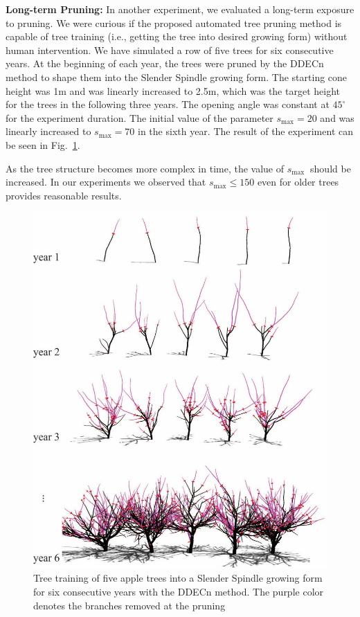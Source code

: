 \noindent\textbf{Long-term Pruning:} In another experiment, we evaluated a
long-term exposure to pruning. We were curious if the proposed automated tree pruning method is capable of tree training (i.e., getting the tree into desired growing form) without human intervention. We have
simulated a row of five trees for six consecutive years. At the
beginning of each year, the trees were pruned by the DDECn method to shape
them into the Slender Spindle growing form. The starting cone height was
1m and was linearly increased to 2.5m, which was the target height for
the trees in the following three years. The opening angle was constant
at $45^\circ$ for the experiment duration. The initial value of the parameter
\(s_{\mathrm{\max}}=20\) and was linearly increased to \(s_{\mathrm{\max}}=70\) in
the sixth year. The result of the experiment can be seen in Fig.~\ref{fig:my_figure7}.

As the tree structure becomes more complex in time, the
value of \(s_{\mathrm{\max}}\ \) should be increased. In our experiments
we observed that \(s_{\mathrm{\max}}\leq{150}\) even
for older trees provides reasonable results.
\begin{figure}[hbt]
    \centering
    \includegraphics[width=0.75\linewidth]{figs/image7.jpeg}
    \caption{Tree training of five apple trees into a Slender
Spindle growing form for six consecutive years with the DDECn method.
The purple color denotes the branches removed at the pruning}
    \label{fig:my_figure7}
\end{figure}


